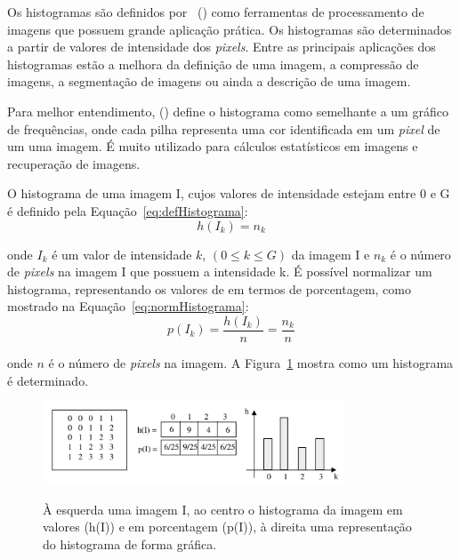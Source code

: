 Os histogramas são definidos por~\citeauthor{marengoni2009tutorial} (\citeyear{marengoni2009tutorial}) como ferramentas de processamento de imagens que possuem grande aplicação prática. Os histogramas são determinados a partir de valores de intensidade dos \textit{pixels}. Entre as principais aplicações dos histogramas estão a melhora da definição de uma imagem, a compressão de imagens, a segmentação de imagens ou ainda a descrição de uma imagem.

Para melhor entendimento, \citeauthor{hoshiro2008processamento} (\citeyear{hoshiro2008processamento}) define o histograma como semelhante a um gráfico de frequências, onde cada pilha representa uma cor identificada em um \textit{pixel} de um uma imagem. É muito utilizado para cálculos estatísticos em imagens e recuperação de imagens.

O histograma de uma imagem I, cujos valores de intensidade estejam entre 0 e G é definido pela Equação~\ref{eq:defHistograma}:
\begin{equation}
\label{eq:defHistograma}
    h(I_k) = n_k
\end{equation}

onde $I_k$ é um valor de intensidade $k$, $(0\leq k\leq G)$ da imagem I e $n_k$ é o número de \textit{pixels} na imagem I que possuem a intensidade k. É possível normalizar um histograma, representando os valores de em termos de porcentagem, como mostrado na Equação~\ref{eq:normHistograma}:
\begin{equation}
\label{eq:normHistograma}
    p(I_k) = \frac{h(I_k)}{n} = \frac{n_k}{n}
\end{equation}

onde $n$ é o número de \textit{pixels} na imagem. A Figura~\ref{fig:modeloHistrograma} mostra como um histograma é determinado.

\begin{figure}[!hbtp]
  \centering
   \caption{À esquerda uma imagem I, ao centro o histograma da imagem em valores (h(I)) e em porcentagem (p(I)), à direita uma representação do histograma de forma gráfica.}
    \includegraphics[width = 0.8\textwidth]{Caps/Figs/ref-teorico/histogram.png}
   \label{fig:modeloHistrograma}
\end{figure}


